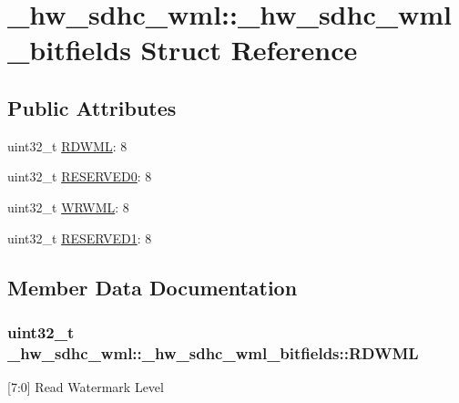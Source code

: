\hypertarget{struct__hw__sdhc__wml_1_1__hw__sdhc__wml__bitfields}{}\section{\+\_\+hw\+\_\+sdhc\+\_\+wml\+:\+:\+\_\+hw\+\_\+sdhc\+\_\+wml\+\_\+bitfields Struct Reference}
\label{struct__hw__sdhc__wml_1_1__hw__sdhc__wml__bitfields}
\subsection*{Public Attributes}
\begin{DoxyCompactItemize}
\item 
uint32\+\_\+t \hyperlink{struct__hw__sdhc__wml_1_1__hw__sdhc__wml__bitfields_a9f22a0ad95e565d533835927d0629f82}{R\+D\+W\+ML}\+: 8
\item 
uint32\+\_\+t \hyperlink{struct__hw__sdhc__wml_1_1__hw__sdhc__wml__bitfields_ad8e51cdb32a47d601bebd10f7f50555d}{R\+E\+S\+E\+R\+V\+E\+D0}\+: 8
\item 
uint32\+\_\+t \hyperlink{struct__hw__sdhc__wml_1_1__hw__sdhc__wml__bitfields_a2c72b7f7e679622adfcec57e7dc7603d}{W\+R\+W\+ML}\+: 8
\item 
uint32\+\_\+t \hyperlink{struct__hw__sdhc__wml_1_1__hw__sdhc__wml__bitfields_aa65460110393b2fe8716da9f51b423c9}{R\+E\+S\+E\+R\+V\+E\+D1}\+: 8
\end{DoxyCompactItemize}


\subsection{Member Data Documentation}
\subsubsection[{\texorpdfstring{R\+D\+W\+ML}{RDWML}}]{\setlength{\rightskip}{0pt plus 5cm}uint32\+\_\+t \+\_\+hw\+\_\+sdhc\+\_\+wml\+::\+\_\+hw\+\_\+sdhc\+\_\+wml\+\_\+bitfields\+::\+R\+D\+W\+ML}\hypertarget{struct__hw__sdhc__wml_1_1__hw__sdhc__wml__bitfields_a9f22a0ad95e565d533835927d0629f82}{}\label{struct__hw__sdhc__wml_1_1__hw__sdhc__wml__bitfields_a9f22a0ad95e565d533835927d0629f82}
\mbox{[}7\+:0\mbox{]} Read Watermark Level 
